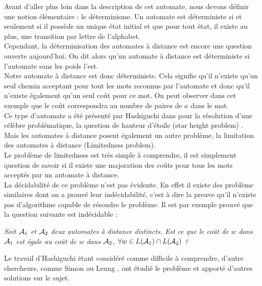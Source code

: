 \documentclass{report}
\begin{document}
Avant d'aller plus loin dans la description de cet automate, nous devons définir une notion élémentaire : le déterminisme. Un automate est déterministe si et seulement si il possède un unique état initial et que pour tout état, il existe au plus, une transition par lettre de l'alphabet.\\
Cependant, la déterminisation des automates à distance est encore une question ouverte aujourd'hui. On dit alors qu'un automate à distance est déterministe si l’automate sans les poids l'est.\\

Notre automate à distance est donc déterministe. Cela signifie qu'il n'existe qu'un seul chemin acceptant pour tout les mots reconnus par l'automate et donc qu'il n'existe également qu'un seul coût pour ce mot. On peut observer dans cet exemple que le coût correspondra au nombre de paires de $a$ dans le mot. \\

Ce type d'automate a été présenté par Hashiguchi dans \cite{Hashiguchi:Limitedness-theorem-on-finite-automata-with-distance-functions:1982:a} pour la résolution d'une célèbre problématique, la question de hauteur d'étoile (star height problem) \cite{Eggan:Transition-graphs-and-the-star-height-of-regular-events:1963:a}. Mais les automates à distance posent également un autre problème, la limitation des automates à distance (Limitedness problem).\\
Le problème de limitedness est très simple à comprendre, il est simplement question de savoir si il existe une majoration des coûts pour tous les mots acceptés par un automate à distance.\\
La décidabilité de ce problème n'est pas évidente. En effet il existe des problème similaires dont on a prouvé leur indécidabilité, c'est à dire la preuve qu'il n'existe pas d'algorithme capable de résoudre le problème. Il est par exemple prouvé que la question suivante est indécidable :
\begin{center}
\textit{Soit $\mathcal{A}_{1}$ et $\mathcal{A}_{2}$ deux automates à distance distincts. Est ce que le coût de $w$ dans $\mathcal{A}_{1}$ est égale au coût de $w$ dans $\mathcal{A}_{2}$, $\forall w \in L(\mathcal{A}_{1}) \cap L(\mathcal{A}_{2})$ ?}
\end{center}
Le travail d'Hashiguchi étant considéré comme difficile à comprendre, d'autre chercheurs, comme Simon \cite{Simon:Semigroups-Matrices-over-Tropical:1994:a} ou Leung \cite{Leung&Podolskiy:limitedness-problem-distance-automata::2004:a}, ont étudié le problème et apporté d'autres solutions sur le sujet.\\
\end{document}
